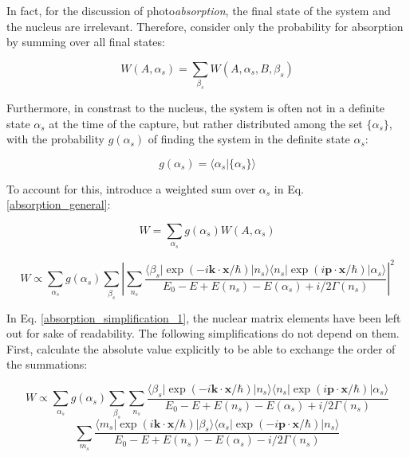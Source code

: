 \documentclass{article}
\begin{document}
In fact, for the discussion of photo\textit{absorption}, the final state of the system and the nucleus are irrelevant. Therefore, consider only the probability for absorption by summing over all final states:

\begin{equation}
\label{absorption_general_no_final}
W(A, \alpha_s) = \sum_{\beta_s} W(A, \alpha_s, B, \beta_s)
\end{equation}


Furthermore, in constrast to the nucleus, the system is often not in a definite state $\alpha_s$ at the time of the capture, but rather distributed among the set $\{ \alpha_s \}$, with the probability $g(\alpha_s)$ of finding the system in the definite state $\alpha_s$:

\begin{equation}
	\label{g_alpha}
	g(\alpha_s) = \langle \alpha_s | \{ \alpha_s \} \rangle
\end{equation}

To account for this, introduce a weighted sum over $\alpha_s$ in Eq. \ref{absorption_general}:

\begin{equation}
\label{absorption_general_alpha_s_distribution}
W = \sum_{\alpha_s} g(\alpha_s) W(A, \alpha_s)
\end{equation}

\begin{equation}
\label{absorption_simplification_1}
	W \propto \sum_{\alpha_s} g(\alpha_s) \sum_{\beta_s} \left| \sum_{n_s} \frac{ \langle \beta_s | \exp{\left( - i \mathbf{k} \cdot \mathbf{x} / \hbar \right)} | n_s \rangle \langle n_s | \exp{\left( i \mathbf{p} \cdot \mathbf{x} / \hbar \right)} | \alpha_s \rangle  }{E_0 - E + E(n_s) - E(\alpha_s) + i/2 \Gamma(n_s)} \right| ^2
\end{equation}

In Eq. \ref{absorption_simplification_1}, the nuclear matrix elements have been left out for sake of readability. 
The following simplifications do not depend on them. 
First, calculate the absolute value explicitly to be able to exchange the order of the summations:

\begin{equation}
\label{absorption_simplification_2}
	W \propto \sum_{\alpha_s} g(\alpha_s) \sum_{\beta_s} \sum_{n_s} \frac{ \langle \beta_s | \exp{\left( - i \mathbf{k} \cdot \mathbf{x} / \hbar \right)} | n_s \rangle \langle n_s | \exp{\left( i \mathbf{p} \cdot \mathbf{x} / \hbar \right)} | \alpha_s \rangle  }{E_0 - E + E(n_s) - E(\alpha_s) + i/2 \Gamma(n_s)} 
\end{equation}	
\begin{equation*}
\sum_{m_s} \frac{ \langle m_s | \exp{\left( i \mathbf{k} \cdot \mathbf{x} / \hbar \right)} | \beta_s \rangle \langle \alpha_s | \exp{\left(  - i \mathbf{p} \cdot \mathbf{x} / \hbar \right)} | n_s \rangle  }{E_0 - E + E(n_s) - E(\alpha_s) - i/2 \Gamma(n_s)}
\end{equation*}
\end{document}
